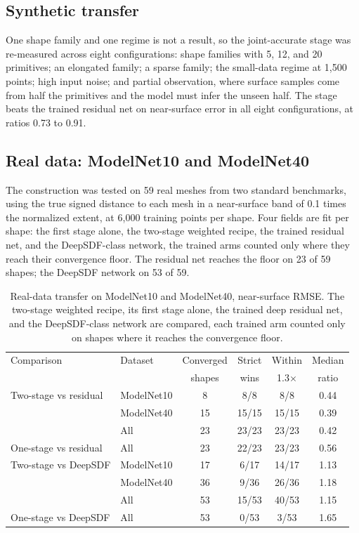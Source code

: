 \documentclass[11pt]{article}
\begin{document}
\subsection{Synthetic transfer}

One shape family and one regime is not a result, so the
joint-accurate stage was re-measured across eight configurations:
shape families with 5, 12, and 20 primitives; an elongated family;
a sparse family; the small-data regime at 1{,}500 points; high
input noise; and partial observation, where surface samples come
from half the primitives and the model must infer the unseen half.
The stage beats the trained residual net on near-surface error in
all eight configurations, at ratios 0.73 to 0.91.

\subsection{Real data: ModelNet10 and ModelNet40}

The construction was tested on 59 real meshes from two standard
benchmarks, using the true signed distance to each mesh in a
near-surface band of 0.1 times the normalized extent, at 6{,}000
training points per shape. Four fields are fit per shape: the first
stage alone, the two-stage weighted recipe, the trained residual
net, and the DeepSDF-class network, the trained arms counted only
where they reach their convergence floor. The
residual net reaches the floor on 23 of 59 shapes; the DeepSDF
network on 53 of 59.

\begin{table}[t]
\centering
\small
\begin{tabular}{llcccc}
\toprule
Comparison & Dataset & Converged & Strict & Within & Median \\
           &         & shapes    & wins   & 1.3$\times$ & ratio \\
\midrule
Two-stage vs residual & ModelNet10 & 8  & 8/8   & 8/8   & 0.44 \\
          & ModelNet40 & 15 & 15/15 & 15/15 & 0.39 \\
          & All        & 23 & 23/23 & 23/23 & 0.42 \\
One-stage vs residual & All        & 23 & 22/23 & 23/23 & 0.56 \\
\midrule
Two-stage vs DeepSDF & ModelNet10 & 17 & 6/17  & 14/17 & 1.13 \\
          & ModelNet40 & 36 & 9/36  & 26/36 & 1.18 \\
          & All        & 53 & 15/53 & 40/53 & 1.15 \\
One-stage vs DeepSDF & All        & 53 & 0/53  & 3/53  & 1.65 \\
\bottomrule
\end{tabular}
\caption{Real-data transfer on ModelNet10 and ModelNet40,
near-surface RMSE. The two-stage weighted recipe, its first stage
alone, the trained deep residual net, and the DeepSDF-class
network are compared, each trained arm counted only on shapes
where it reaches the convergence floor.}
\label{tab:real}
\end{table}
\end{document}
